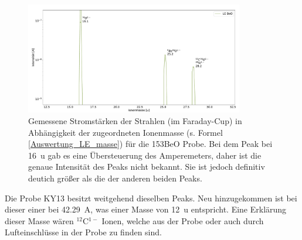 \begin{figure}[H]
	\centering
    \includegraphics[width=0.85\textwidth]{Pictures/LE_BeO_neu.pdf}
	\caption{Gemessene Stromstärken der Strahlen (im Faraday-Cup) in Abhängigkeit der zugeordneten Ionenmasse (s. Formel \ref{Auswertung_LE_masse}) für die 153BeO Probe. Bei dem Peak bei \SI{16}{\atomicmassunit} gab es eine Übersteuerung des Amperemeters, daher ist die genaue Intensität des Peaks nicht bekannt. Sie ist jedoch definitiv deutich größer als die der anderen beiden Peaks.}
	\label{Probe_Be}
\end{figure}
Die Probe KY13 besitzt weitgehend dieselben Peaks.
Neu hinzugekommen ist bei dieser einer bei \SI{42.29}{\ampere}, was einer Masse von \SI{12}{\atomicmassunit} entspricht.
Eine Erklärung dieser Masse wären $^{12}$C$^{1-}$ Ionen, welche aus der Probe oder auch durch Lufteinschlüsse in der Probe zu finden sind.

